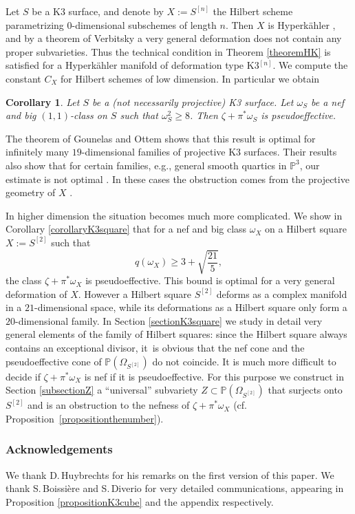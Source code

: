 \documentclass[11pt]{article}
\newcommand{\eg}{e.g.,\xspace}
\newcommand{\cf}{cf.\xspace}
\theoremstyle{plain}
\newtheorem{corollary}[theorem]{Corollary}
\theoremstyle{definition}
\newcommand{\PP}{\ensuremath{\mathbb{P}}}
\begin{document}
Let $S$ be a K3 surface, and denote by $X:=S^{[n]}$ the Hilbert scheme parametrizing $0$-dimensional subschemes
of length $n$. Then $X$ is Hyperkähler \cite{Bea83}, and by a theorem of Verbitsky
\cite[Th.\,1.1]{Ver98} a very general deformation does not contain any proper subvarieties.
Thus the technical condition in Theorem \ref{theoremHK} is satisfied for a Hyperkähler manifold of deformation type K3$^{[n]}$.
We compute the constant $C_X$ for Hilbert schemes of low dimension. In particular we obtain

\begin{corollary} \label{corollaryK3surface}
Let $S$ be a (not necessarily projective) K3 surface.
Let $\omega_S$ be a nef and big $(1,1)$-class on $S$ such that $\omega_S^2 \geq 8$.
Then $\zeta+\pi^*\omega_S$ is pseudoeffective.
\end{corollary}

The theorem of Gounelas and Ottem shows that this result is optimal for infinitely many $19$-dimensional families of projective K3 surfaces. Their results also show that for certain families, \eg general smooth quartics in $\PP^3$, our estimate is not optimal \cite[Cor.\,4.2]{GO18}. In these cases the obstruction comes from the projective geometry of $X$ \cite[\S 4.2]{GO18}.

In higher dimension the situation becomes much more complicated. We show in
Corollary \ref{corollaryK3square} that for a nef and big class $\omega_X$ on a Hilbert square $X:=S^{[2]}$
such that
\[
q(\omega_X)\geq 3+\sqrt{\frac{21}{5}},
\]
the class $\zeta+\pi^*\omega_X$ is pseudoeffective. This bound is optimal
for a very general defor\-ma\-tion of $X$. However a Hilbert square $S^{[2]}$ deforms as a complex manifold in a
$21$\nobreakdash-dimensional space, while its deformations as a Hilbert square only form a $20$\nobreakdash-dimen\-sional family.
In Section \ref{sectionK3square} we study in detail very general elements of the family of Hilbert squares:
since the Hilbert square always contains an exceptional divisor, it~is obvious
that the nef cone and the pseudoeffective cone of $\PP(\Omega_{S^{[2]}})$ do not coincide.
It is much more difficult to decide if $\zeta+\pi^* \omega_X$ is nef if it is pseudoeffective.
For this purpose we construct in Section \ref{subsectionZ} a ``universal''
subvariety $Z \subset \PP(\Omega_{S^{[2]}})$ that surjects onto~$S^{[2]}$ and is an obstruction
to the nefness of $\zeta+\pi^* \omega_X$ (\cf Proposition~\ref{propositionthenumber}).

\subsubsection*{Acknowledgements}
We thank D.\,Huybrechts for his remarks on the first version of this paper.
We thank S.\,Boissière and S.\,Diverio for very detailed communications, appearing in Proposition \ref{propositionK3cube}
and the appendix respectively.
\end{document}
